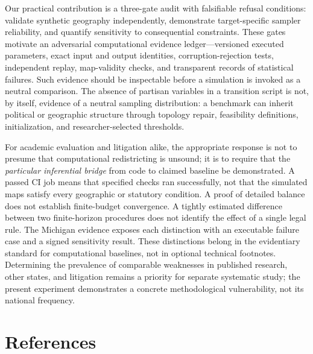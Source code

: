 \documentclass[
  10pt,
]{article}
\begin{document}
Our practical contribution is a three-gate audit with falsifiable
refusal conditions: validate synthetic geography independently,
demonstrate target-specific sampler reliability, and quantify
sensitivity to consequential constraints. These gates motivate an
adversarial computational evidence ledger---versioned executed
parameters, exact input and output identities, corruption-rejection
tests, independent replay, map-validity checks, and transparent records
of statistical failures. Such evidence should be inspectable before a
simulation is invoked as a neutral comparison. The absence of partisan
variables in a transition script is not, by itself, evidence of a
neutral sampling distribution: a benchmark can inherit political or
geographic structure through topology repair, feasibility definitions,
initialization, and researcher-selected thresholds.

For academic evaluation and litigation alike, the appropriate response
is not to presume that computational redistricting is unsound; it is to
require that the \emph{particular inferential bridge} from code to
claimed baseline be demonstrated. A passed CI job means that specified
checks ran successfully, not that the simulated maps satisfy every
geographic or statutory condition. A proof of detailed balance does not
establish finite-budget convergence. A tightly estimated difference
between two finite-horizon procedures does not identify the effect of a
single legal rule. The Michigan evidence exposes each distinction with
an executable failure case and a signed sensitivity result. These
distinctions belong in the evidentiary standard for computational
baselines, not in optional technical footnotes. Determining the
prevalence of comparable weaknesses in published research, other states,
and litigation remains a priority for separate systematic study; the
present experiment demonstrates a concrete methodological vulnerability,
not its national frequency.

\hypertarget{references}{%
\section*{References}\label{references}}
\end{document}
